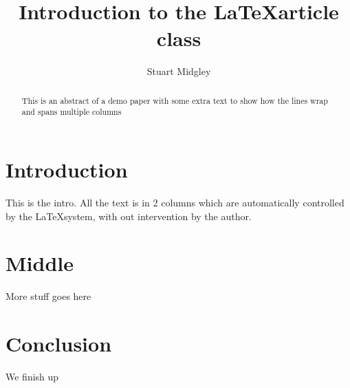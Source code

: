 \documentclass[a4paper,12pt,twocolumn]{article}
\begin{document}
\author{Stuart Midgley}
\title{Introduction to the \LaTeX article class}
\maketitle
\begin{abstract}
    This is an abstract of a demo paper with some extra
    text to show how the lines wrap and spans multiple columns
\end{abstract}
\section{Introduction}
    This is the intro.  All the text is in 2 columns which
    are automatically controlled by the \LaTeX system, with
    out intervention by the author.
\section{Middle}
    More stuff goes here
\section{Conclusion}
    We finish up
\end{document}
